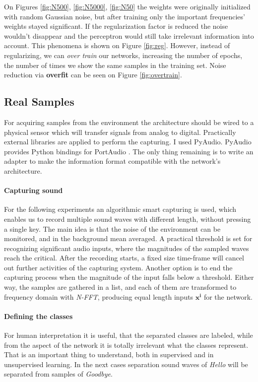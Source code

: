 On Figures \ref{fig:N500}, \ref{fig:N5000}, \ref{fig:N50} the weights were originally initialized with random Gaussian noise, but after training only the important frequencies' weights stayed significant. 
If the regularization factor is reduced the noise wouldn't disappear and the perceptron would still take irrelevant information into account. 
This phenomena is shown on Figure \ref{fig:reg}. 
However, instead of regularizing, we can \emph{over train} our networks, increasing the number of epochs, the number of times we show the same samples in the training set. 
Noise reduction via \textbf{overfit} can be seen on Figure \ref{fig:overtrain}. 

\subsection{Real Samples}
For acquiring samples from the environment the architecture should be wired to a physical sensor which will transfer signals from analog to digital. 
Practically external libraries are applied to perform the capturing. I used PyAudio. PyAudio provides Python bindings for PortAudio \cite{pham2006pyaudio}. 
The only thing remaining is to write an adapter to make the information format compatible with the network's architecture.

\paragraph{Capturing sound}
For the following experiments an algorithmic smart capturing is used, which enables us to record multiple sound waves with different length, without pressing a single key. The main idea is that the noise of the environment can be monitored, and in the background mean averaged. A practical threshold is set for recognizing significant audio inputs, where the magnitudes of the sampled waves reach the critical. After the recording starts, a fixed size time-frame will cancel out further activities of the capturing system. Another option is to end the capturing process when the magnitude of the input falls below a threshold. Either way, the samples are gathered in a list, and each of them are transformed to frequency domain with \emph{N-FFT}, producing equal length inputs  $\mathbf{x^i}$ for the network.

\paragraph{Defining the classes}
For human interpretation it is useful, that the separated classes are labeled, while from the aspect of the network it is totally irrelevant what the classes represent. That is an important thing to understand, both in supervised and in unsupervised learning. In the next cases separation sound waves of \emph{Hello} will be separated from samples of \emph{Goodbye}.

